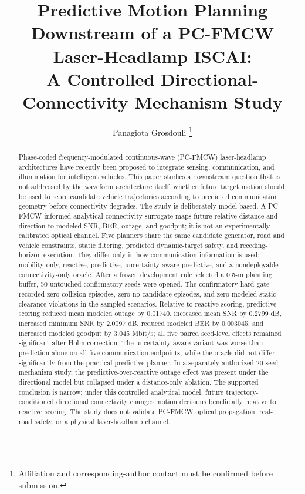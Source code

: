 \documentclass[journal]{IEEEtran}
\title{Predictive Motion Planning Downstream of a PC-FMCW Laser-Headlamp ISCAI:\\
A Controlled Directional-Connectivity Mechanism Study}
\author{Panagiota Grosdouli%
\thanks{Affiliation and corresponding-author contact must be confirmed before submission.}}
\begin{document}
\maketitle

\begin{abstract}
Phase-coded frequency-modulated continuous-wave (PC-FMCW) laser-headlamp architectures have recently been proposed to integrate sensing, communication, and illumination for intelligent vehicles. This paper studies a downstream question that is not addressed by the waveform architecture itself: whether future target motion should be used to score candidate vehicle trajectories according to predicted communication geometry before connectivity degrades. The study is deliberately model based. A PC-FMCW-informed analytical connectivity surrogate maps future relative distance and direction to modeled SNR, BER, outage, and goodput; it is not an experimentally calibrated optical channel. Five planners share the same candidate generator, road and vehicle constraints, static filtering, predicted dynamic-target safety, and receding-horizon execution. They differ only in how communication information is used: mobility-only, reactive, predictive, uncertainty-aware predictive, and a nondeployable connectivity-only oracle. After a frozen development rule selected a 0.5-m planning buffer, 50 untouched confirmatory seeds were opened. The confirmatory hard gate recorded zero collision episodes, zero no-candidate episodes, and zero modeled static-clearance violations in the sampled scenarios. Relative to reactive scoring, predictive scoring reduced mean modeled outage by 0.01740, increased mean SNR by 0.2799 dB, increased minimum SNR by 2.0097 dB, reduced modeled BER by 0.003045, and increased modeled goodput by 3.045 Mbit/s; all five paired seed-level effects remained significant after Holm correction. The uncertainty-aware variant was worse than prediction alone on all five communication endpoints, while the oracle did not differ significantly from the practical predictive planner. In a separately authorized 20-seed mechanism study, the predictive-over-reactive outage effect was present under the directional model but collapsed under a distance-only ablation. The supported conclusion is narrow: under this controlled analytical model, future trajectory-conditioned directional connectivity changes motion decisions beneficially relative to reactive scoring. The study does not validate PC-FMCW optical propagation, real-road safety, or a physical laser-headlamp channel.
\end{abstract}
\end{document}
